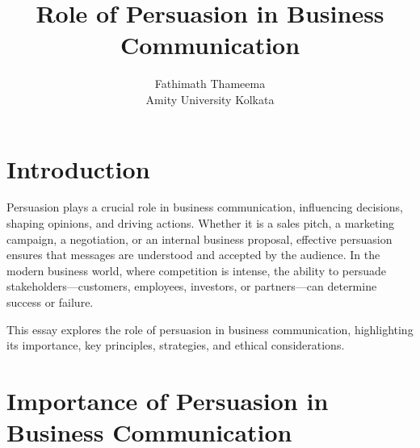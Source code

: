 \documentclass[a4paper]{article}
\title{Role of Persuasion in Business Communication}
\author{Fathimath Thameema \\ Amity University Kolkata \\ }
\begin{document}
\maketitle


\section{Introduction}

Persuasion plays a crucial role in business communication, influencing decisions, shaping opinions, and driving actions. Whether it is a sales pitch, a marketing campaign, a negotiation, or an internal business proposal, effective persuasion ensures that messages are understood and accepted by the audience. In the modern business world, where competition is intense, the ability to persuade stakeholders—customers, employees, investors, or partners—can determine success or failure.

This essay explores the role of persuasion in business communication, highlighting its importance, key principles, strategies, and ethical considerations.

\section{Importance of Persuasion in Business Communication}
\end{document}
